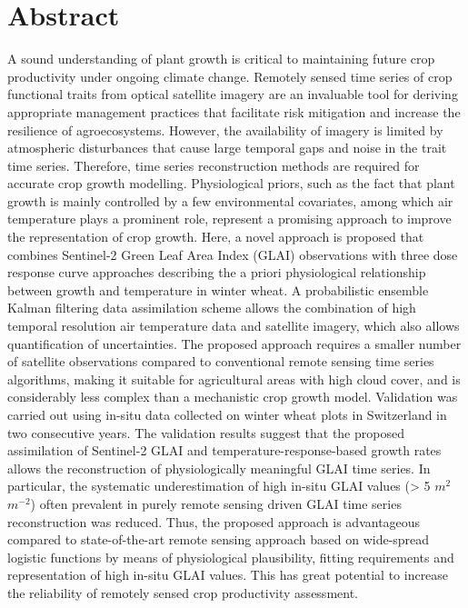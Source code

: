 \section*{Abstract}
A sound understanding of plant growth is critical to maintaining future crop productivity under ongoing climate change. Remotely sensed time series of crop functional traits from optical satellite imagery are an invaluable tool for deriving appropriate management practices that facilitate risk mitigation and increase the resilience of agroecosystems. However, the availability of imagery is limited by atmospheric disturbances that cause large temporal gaps and noise in the trait time series. 
Therefore, time series reconstruction methods are required for accurate crop growth modelling. Physiological priors, such as the fact that plant growth is mainly controlled by a few environmental covariates, among which air temperature plays a prominent role, represent a promising approach to improve the representation of crop growth. Here, a novel approach is proposed that combines Sentinel-2 Green Leaf Area Index (GLAI) observations with three dose response curve approaches describing the a priori physiological relationship between growth and temperature in winter wheat. A probabilistic ensemble Kalman filtering data assimilation scheme allows the combination of high temporal resolution air temperature data and satellite imagery, which also allows quantification of uncertainties. 
The proposed approach requires a smaller number of satellite observations compared to conventional remote sensing time series algorithms, making it suitable for agricultural areas with high cloud cover, and is considerably less complex than a mechanistic crop growth model. Validation was carried out using in-situ data collected on winter wheat plots in Switzerland in two consecutive years. The validation results suggest that the proposed assimilation of Sentinel-2 GLAI and temperature-response-based growth rates allows the reconstruction of physiologically meaningful GLAI time series. In particular, the systematic underestimation of high in-situ GLAI values (> 5 $m^2$ $m^{-2}$) often prevalent in purely remote sensing driven GLAI time series reconstruction was reduced. Thus, the proposed approach is advantageous compared to state-of-the-art remote sensing approach based on wide-spread logistic functions by means of physiological plausibility, fitting requirements and representation of high in-situ GLAI values. This has great potential to increase the reliability of remotely sensed crop productivity assessment.

